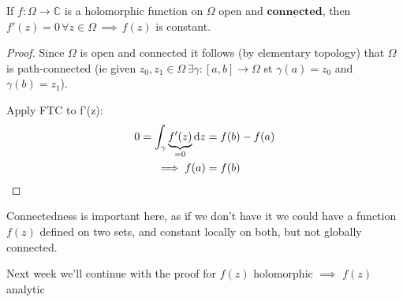 \begin{corollary}
If $f:\Omega \rightarrow \mathbb{C}$ is a holomorphic function on $\Omega$ open and $\underline{\textbf{connected}}$, then $f'(z)=0 \, \forall z \in \Omega \, \implies \, f(z)$ is constant.
\end{corollary}

\begin{proof}
Since $\Omega$ is open and connected it follows (by elementary topology) that $\Omega$ is path-connected (ie given $z_0,z_1 \in \Omega \, \exists \gamma:[a,b] \rightarrow \Omega$ st $ \gamma(a) = z_0$ and $\gamma(b) = z_1$).

Apply FTC to f'(z):
\begin{align*}
    0 = \int_\gamma \underbrace{f'(z)}_{=0}  \dif z &= f(b) - f(a)\\
    \implies f(a) &= f(b)
\end{align*}
\end{proof}
\begin{remark}
Connectedness is important here, as if we don't have it we could have a function $f(z)$ defined on two sets, and constant locally on both, but not globally connected.
\end{remark}

Next week we'll continue with the proof for $f(z)$ holomorphic $\implies$ $f(z)$ analytic
